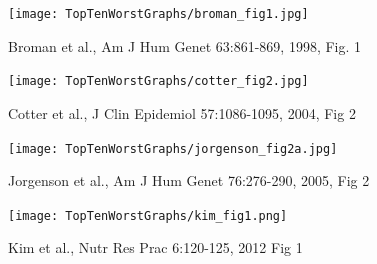 \documentclass[12pt]{article}
\newcommand{\headsize}{\fontsize{35}{35} \selectfont}
\newcommand{\smallestsize}{\fontsize{18}{22} \selectfont}
\begin{document}
\newpage
\thispagestyle{empty}

\headsize \color{yellow}
\hfill \begin{minipage}{5.75in}
\end{minipage}

\vspace{30mm}

\centerline{\texttt{[image: TopTenWorstGraphs/broman\_fig1.jpg]}}

\vfill \hfill \smallestsize \color{blue}
Broman et al., Am J Hum Genet 63:861-869, 1998, Fig. 1

\newpage
\thispagestyle{empty}


\headsize \color{yellow}
\hfill \begin{minipage}{5.75in}
\end{minipage}

\vspace{30mm}

\centerline{\texttt{[image: TopTenWorstGraphs/cotter\_fig2.jpg]}}

\vfill \hfill \smallestsize \color{blue}
Cotter et al., J Clin Epidemiol 57:1086-1095, 2004, Fig 2

\newpage
\thispagestyle{empty}


\headsize \color{yellow}
\hfill \begin{minipage}{5.75in}
\end{minipage}

\vspace{30mm}

\centerline{\texttt{[image: TopTenWorstGraphs/jorgenson\_fig2a.jpg]}}

\vfill \hfill \smallestsize \color{blue}
Jorgenson et al., Am J Hum Genet 76:276-290, 2005, Fig 2

\newpage
\thispagestyle{empty}

\headsize \color{yellow}
\hfill \begin{minipage}{5.75in}
\end{minipage}

\vspace{30mm}

\centerline{\texttt{[image: TopTenWorstGraphs/kim\_fig1.png]}}

\vfill \hfill \smallestsize \color{blue}
Kim et al., Nutr Res Prac 6:120-125, 2012
Fig 1

\newpage
\thispagestyle{empty}


\headsize \color{yellow}
\hfill \begin{minipage}{5.75in}
\end{minipage}
\end{document}

